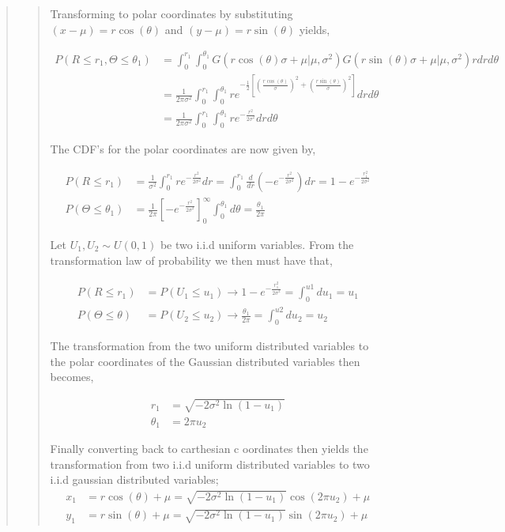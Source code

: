 \begin{quote}
\begin{quote}
Transforming to polar coordinates by substituting $ (x-\mu) = r \cos(\theta)$ and $ (y-\mu) = r\sin(\theta)$ yields,

\begin{align*}
P(R \leq r_1, \Theta \leq \theta_1) &= \int_0^{r_1} \int_{0}^{\theta_1} G(r\cos(\theta) \sigma + \mu| \mu, \sigma^2) G(r\sin(\theta) \sigma + \mu| \mu, \sigma^2) r dr d\theta \\
&= \frac{1}{2 \pi \sigma^2} \int_0^{r_1} \int_{0}^{\theta_1} re^{ -\frac{1}{2} \left[ \left( \frac{r\cos(\theta)}{\sigma} \right)^2  + \left( \frac{r\sin(\theta)}{\sigma} \right)^2 \right]}  dr d\theta \\
&=  \frac{1}{2 \pi \sigma^2} \int_0^{r_1} \int_{0}^{\theta_1} re^{ -\frac{r^2}{2 \sigma ^2} } dr d\theta
\end{align*}

The CDF's  for the polar coordinates are now given by, %

\begin{align}
P(R \leq r_1) &= \frac{1}{\sigma^2} \int_{0}^{r_1}  re^{ -\frac{r^2}{2 \sigma ^2} } dr =  \int_{0}^{r_1} \frac{d}{dr} \left( -e^{ -\frac{r^2}{2 \sigma ^2}}  \right) dr = 1 - e^{- \frac{r_1^2}{2 \sigma^2}} \\
P(\Theta \leq \theta_1) &= \frac{1}{2 \pi }  \left[ -e^{-\frac{r^2}{2 \sigma^2}} \right]^{\infty}_{0} \int_{0}^{\theta_1} d\theta = \frac{\theta_1}{2\pi}
\end{align}

Let $U_1, U_2 \sim U(0,1)$ be two i.i.d uniform variables. From the transformation law of probability we then must have that, %

\begin{align}
P(R \leq r_1) &= P(U_1 \leq u_1) \rightarrow  1 - e^{- \frac{r_1^2}{2\sigma^2}}  = \int_{0}^{u1} du_1 = u_1 \\
P(\Theta \leq \theta) &= P(U_2 \leq u_2) \rightarrow   \frac{\theta_1}{2\pi} = \int_{0}^{u2} du_2 = u_2 
\end{align}

The transformation from the two uniform distributed variables to the polar coordinates of the Gaussian distributed variables then becomes,

\begin{align}
r_1 &=  \sqrt{-2\sigma^2 \ln(1 - u_1)} \\
\theta_1 &= 2 \pi u_2
\end{align}

Finally converting back to carthesian c oordinates then yields the transformation from two i.i.d uniform distributed variables to two i.i.d gaussian distributed variables;
\begin{align*}
x_1 &= r\cos(\theta) + \mu = \sqrt{-2\sigma^2 \ln(1 - u_1)} \cos( 2 \pi u_2 ) + \mu \\
y_1 &= r\sin(\theta) + \mu = \sqrt{-2\sigma^2 \ln(1 - u_1)} \sin( 2 \pi u_2 ) + \mu
\end{align*}


\end{quote}
\end{quote}

